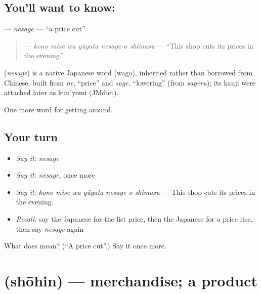 \subsection*{You'll want to know: }
\textbf{} — \emph{nesage} — \textquotedblleft{}a price cut\textquotedblright{}.

\begin{quote}
\textbf{    } — \emph{kono mise wa yūgata nesage o shimasu} — \textquotedblleft{}This shop cuts its prices in the evening.\textquotedblright{}
\end{quote}

\begin{cousinweb}
\textbf{} (\emph{nesage}) is a native Japanese word (wago), inherited rather than borrowed from Chinese, built from \emph{ne}, \textquotedblleft{}price\textquotedblright{} and \emph{sage}, \textquotedblleft{}lowering\textquotedblright{} (from \emph{sageru}); its kanji were attached later as kun'yomi (JMdict).
\end{cousinweb}

\begin{grammarlens}[title={What you've built}]
One more word for getting around.
\end{grammarlens}

\subsection*{Your turn}
\begin{itemize}
\raggedright
  \item \emph{Say it:} \emph{nesage}
  \item \emph{Say it:} \emph{nesage}, once more
  \item \emph{Say it:} \emph{kono mise wa yūgata nesage o shimasu} — This shop cuts its prices in the evening.
  \item \emph{Recall:} say the Japanese for the list price, then the Japanese for a price rise, then say \emph{nesage} again
\end{itemize}

\begin{tcolorbox}[breakable,colback=teal!4,colframe=teal!35!black,title={Before you move on}]
What does  mean? (\textquotedblleft{}A price cut\textquotedblright{}.) Say it once more.
\end{tcolorbox}
\section[\texorpdfstring{\ja{しょうひん} (shōhin)}{しょうひん (shōhin)}]{ (shōhin) — merchandise; a product}

